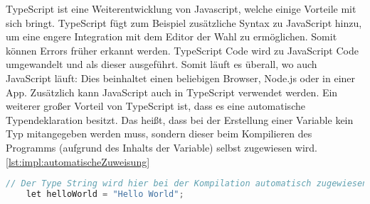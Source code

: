 TypeScript ist eine Weiterentwicklung von Javascript, welche einige Vorteile mit sich bringt. TypeScript fügt zum Beispiel zusätzliche Syntax zu JavaScript hinzu, um eine engere Integration mit dem Editor der Wahl zu ermöglichen. Somit können Errors früher erkannt werden. TypeScript Code wird zu JavaScript Code umgewandelt und als dieser ausgeführt. Somit läuft es überall, wo auch JavaScript läuft: Dies beinhaltet einen beliebigen Browser, Node.js oder in einer App. Zusätzlich kann JavaScript auch in TypeScript verwendet werden. Ein weiterer großer Vorteil von TypeScript ist, dass es eine automatische Typendeklaration besitzt. Das heißt, dass bei der Erstellung einer Variable kein Typ mitangegeben werden muss, sondern dieser beim Kompilieren des Programms (aufgrund des Inhalts der Variable) selbst zugewiesen wird. \ref{lst:impl:automatischeZuweisung}
\cite{JavaScriptJavaEntwickler} 
\cite{TypeScriptOverview} 

\begin{lstlisting}[language=java,caption=TypeScript automatische Zuweisung,label=lst:impl:automatischeZuweisung]
    // Der Type String wird hier bei der Kompilation automatisch zugewiesen
    let helloWorld = "Hello World";
\end{lstlisting}